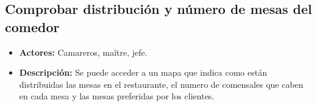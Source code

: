 \documentclass[spanish,a4paper,12pt]{report}	%
\begin{document}

			
		\subsection{Comprobar distribución y número de mesas del comedor}
			\begin{itemize}
				\item \textbf{Actores:} Camareros, maître, jefe.
				\item \textbf{Descripción:} Se puede acceder a un mapa que indica como están distribuidas las mesas en el restaurante, el numero de comensales que caben en cada mesa y las mesas preferidas por los clientes.
			\end {itemize}

\end{document}
